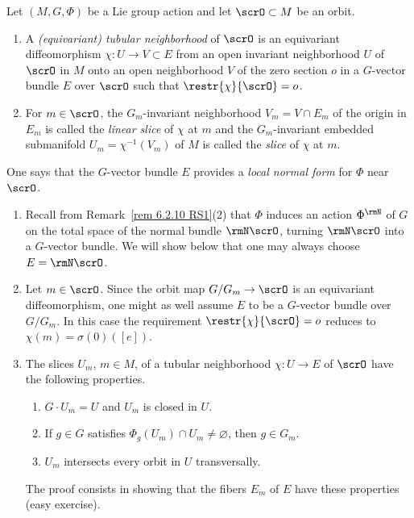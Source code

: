 \begin{defn}
    Let $(M,G,\Phi)$ be a Lie group action and let $\scrO\subset M$ be an orbit.
    \begin{enumerate}
        \item A \emph{(equivariant) tubular neighborhood} of $\scrO$ is an equivariant diffeomorphism $\chi:U\to V\subset E$  from an open invariant neighborhood $U$ of $\scrO$ in $M$ onto an open neighborhood $V$ of the zero section $o$ in a $G$-vector bundle $E$ over $\scrO$ such that $\restr{\chi}{\scrO}=o$.
        \item For $m\in \scrO$, the $G_m$-invariant neighborhood $V_m=V\cap E_m$ of the origin in $E_m$ is called the \emph{linear slice} of $\chi$ at $m$ and the $G_m$-invariant embedded submanifold $U_m=\chi^{-1}(V_m)$ of $M$ is called the \emph{slice} of $\chi$ at $m$.
    \end{enumerate}
    One says that the $G$-vector bundle $E$ provides a \emph{local normal form} for $\Phi$ near $\scrO$.
\end{defn}

\begin{rem}\label{rem 6.4.2 RS1}
    \begin{enumerate}
        \item Recall from Remark~\ref{rem 6.2.10 RS1}(2) that $\Phi$ induces an action $\Phi^\rmN$ of $G$ on the total space of the normal bundle $\rmN\scrO$, turning $\rmN\scrO$ into a $G$-vector bundle. We will show below that one may always choose $E=\rmN\scrO$.
        \item Let $m\in \scrO$. Since the orbit map $G\slash G_m\to \scrO$ is an equivariant diffeomorphism, one might as well assume $E$ to be a $G$-vector bundle over $G\slash G_m$. In this case the requirement $\restr{\chi}{\scrO}=o$ reduces to $\chi(m)=\sigma(0)([e])$.
        \item  The slices $U_m$, $m\in M$, of a tubular neighborhood $\chi:U\to E$ of $\scrO$ have the following properties.
        \begin{enumerate}[label=(\alph*)]
            \item $G\cdot U_m=U$ and $U_m$ is closed in $U$.
            \item If $g\in G$ satisfies $\Phi_g(U_m)\cap U_m\neq \varnothing$, then $g\in G_m$.
            \item $U_m$ intersects every orbit in $U$ transversally.
        \end{enumerate}
        The proof consists in showing that the fibers $E_m$ of $E$ have these properties (easy exercise).
    \end{enumerate}
\end{rem}

